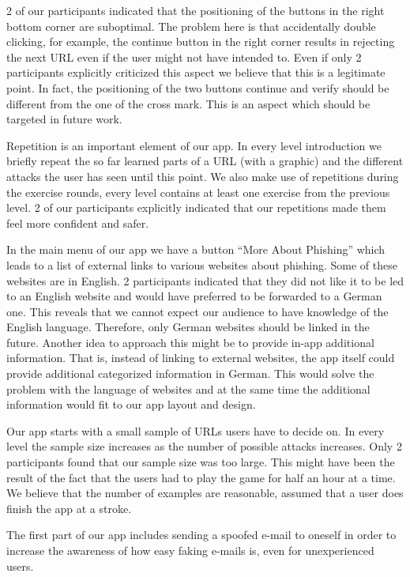 \begin{description}[leftmargin=0cm]
2 of our participants indicated that the positioning of the buttons in the right bottom corner are suboptimal.
The problem here is that accidentally double clicking, for example, the continue button in the right corner results in rejecting the next URL even if the user might not have intended to.
Even if only 2 participants explicitly criticized this aspect we believe that this is a legitimate point.
In fact, the positioning of the two buttons continue and verify should be different from the one of the cross mark.
This is an aspect which should be targeted in future work. 
	\item[Repetition:]
Repetition is an important element of our app.
In every level introduction we briefly repeat the so far learned parts of a URL (with a graphic) and the different attacks the user has seen until this point.
We also make use of repetitions during the exercise rounds, every level contains at least one exercise from the previous level.
2 of our participants explicitly indicated that our repetitions made them feel more confident and safer.
	\item[External Links:]
In the main menu of our app we have a button ``More About Phishing'' which leads to a list of external links to various websites about phishing.
Some of these websites are in English.
2 participants indicated that they did not like it to be led to an English website and would have preferred to be forwarded to a German one.
This reveals that we cannot expect our audience to have knowledge of the English language.
Therefore, only German websites should be linked in the future.
Another idea to approach this might be to provide in-app additional information.
That is, instead of linking to external websites, the app itself could provide additional categorized information in German.
This would solve the problem with the language of websites and at the same time the additional information would fit to our app layout and design.
	\item[Amount of Examples:] Our app starts with a small sample of URLs users have to decide on.
In every level the sample size increases as the number of possible attacks increases.
Only 2 participants found that our sample size was too large.
This might have been the result of the fact that the users had to play the game for half an hour at a time.
We believe that the number of examples are reasonable, assumed that a user does finish the app at a stroke.
	\item[E-Mail Not Received:] The first part of our app includes sending a spoofed e-mail to oneself in order to increase the awareness of how easy faking e-mails is, even for unexperienced users.

\end{description}
